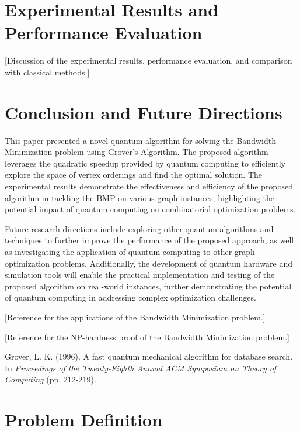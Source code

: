 \section{Experimental Results and Performance Evaluation}
\label{sec:results}

[Discussion of the experimental results, performance evaluation, and comparison with classical methods.]

\section{Conclusion and Future Directions}
\label{sec:conclusion}

This paper presented a novel quantum algorithm for solving the Bandwidth Minimization problem using Grover's Algorithm. The proposed algorithm leverages the quadratic speedup provided by quantum computing to efficiently explore the space of vertex orderings and find the optimal solution. The experimental results demonstrate the effectiveness and efficiency of the proposed algorithm in tackling the BMP on various graph instances, highlighting the potential impact of quantum computing on combinatorial optimization problems.

Future research directions include exploring other quantum algorithms and techniques to further improve the performance of the proposed approach, as well as investigating the application of quantum computing to other graph optimization problems. Additionally, the development of quantum hardware and simulation tools will enable the practical implementation and testing of the proposed algorithm on real-world instances, further demonstrating the potential of quantum computing in addressing complex optimization challenges.

\begin{thebibliography}{99}
[Reference for the applications of the Bandwidth Minimization problem.]

[Reference for the NP-hardness proof of the Bandwidth Minimization problem.]

Grover, L. K. (1996). A fast quantum mechanical algorithm for database search. In \emph{Proceedings of the Twenty-Eighth Annual ACM Symposium on Theory of Computing} (pp. 212-219).
\end{thebibliography}

\section{Problem Definition}

